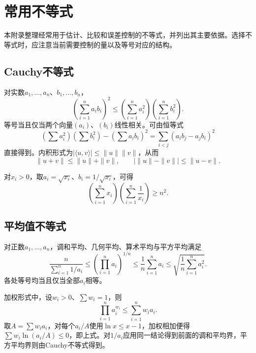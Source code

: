 \chapter{常用不等式}
\label{app:inequalities}

本附录整理经常用于估计、比较和误差控制的不等式，并列出其主要依据。选择不等式时，应注意当前需要控制的量以及等号对应的结构。

\section{Cauchy不等式}

对实数\(a_1,\ldots,a_n\)、\(b_1,\ldots,b_n\)，
\begin{equation*}
 \left(\sum_{i=1}^n a_ib_i\right)^2
 \le\left(\sum_{i=1}^n a_i^2\right)\left(\sum_{i=1}^n b_i^2\right).
\end{equation*}
等号当且仅当两个向量\((a_i)\)、\((b_i)\)线性相关。可由恒等式
\begin{equation*}
 \left(\sum a_i^2\right)\left(\sum b_i^2\right)-\left(\sum a_ib_i\right)^2
 =\sum_{i<j}(a_ib_j-a_jb_i)^2
\end{equation*}
直接得到。内积形式为\(|\langle u,v\rangle|\le\|u\|\|v\|\)，从而
\begin{equation*}
 \|u+v\|\le\|u\|+\|v\|,\qquad
 \bigl|\|u\|-\|v\|\bigr|\le\|u-v\|.
\end{equation*}

对\(x_i>0\)，取\(a_i=\sqrt{x_i}\)、\(b_i=1/\sqrt{x_i}\)，可得
\begin{equation*}
 \left(\sum_{i=1}^n x_i\right)\left(\sum_{i=1}^n\frac1{x_i}\right)\ge n^2.
\end{equation*}

\section{平均值不等式}

对正数\(a_1,\ldots,a_n\)，调和平均、几何平均、算术平均与平方平均满足
\begin{equation*}
 \frac{n}{\sum_{i=1}^n1/a_i}
 \le\left(\prod_{i=1}^n a_i\right)^{1/n}
 \le\frac1n\sum_{i=1}^n a_i
 \le\sqrt{\frac1n\sum_{i=1}^n a_i^2}.
\end{equation*}
各处等号均当且仅当全部\(a_i\)相等。

加权形式中，设\(w_i>0\)、\(\sum w_i=1\)，则
\begin{equation*}
 \prod_{i=1}^n a_i^{w_i}\le\sum_{i=1}^n w_i a_i.
\end{equation*}
取\(A=\sum w_i a_i\)，对每个\(a_i/A\)使用\(\ln x\le x-1\)，加权相加便得\(\sum w_i\ln(a_i/A)\le0\)，即上式。对\(1/a_i\)应用同一结论得到前面的调和平均界，平方平均界则由Cauchy不等式得到。

